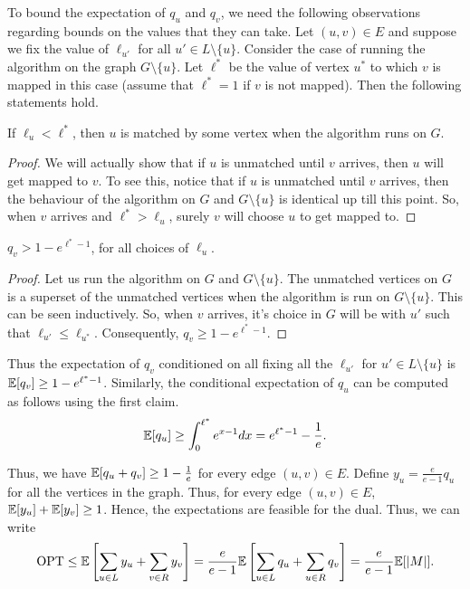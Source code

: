 To bound the expectation of $q_u$ and $q_v$, we need the following observations
regarding bounds on the values that they can take. Let $(u,v)\in E$ and suppose
we fix the value of $\ell_{u'}$ for all $u'\in L \setminus \{u\}$. Consider the
case of running the algorithm on the graph $G \setminus \{u\}$. Let $\ell^*$ be the
value of vertex $u^*$ to which $v$ is mapped in this case (assume that
$\ell^* = 1$ if $v$ is not mapped). Then the following statements hold.

\begin{claim}
  If $\ell_u < \ell^*$, then $u$ is matched by some vertex when the
  algorithm runs on $G$.
\end{claim}
\begin{proof}
  We will actually show that if $u$ is unmatched until $v$ arrives, then $u$
  will get mapped to $v$. To see this, notice that if $u$ is unmatched until $v$
  arrives, then the behaviour of the algorithm on $G$ and $G\setminus \{u\}$ is
  identical up till this point. So, when $v$ arrives and $\ell^* > \ell_u$,
  surely $v$ will choose $u$ to get mapped to.
\end{proof}

\begin{claim}
  $q_v > 1 - e^{\ell^* - 1}$, for all choices of $\ell_u$.
\end{claim}
\begin{proof}
  Let us run the algorithm on $G$ and $G\setminus \{u\}$. The unmatched vertices
  on $G$ is a superset of the unmatched vertices when the algorithm is run on
  $G\setminus \{u\}$. This can be seen inductively. So, when $v$ arrives, it's
  choice in $G$ will be with $u'$ such that $\ell_{u'} \leq
  \ell_{u^*}$. Consequently, $q_v \geq 1 - e^{\ell^* - 1}$.
\end{proof}

Thus the expectation of $q_v$ conditioned on all fixing all the $\ell_{u'}$ for
$u' \in L \setminus \{u\}$ is $\mathbb{E}[q_v] \geq 1 - e^{\ell^* - 1}$. Similarly, the
conditional expectation of $q_u$ can be computed as follows using the first claim.
\begin{align*}
  \mathbb{E}[q_u] \geq \int_{0}^{\ell^*} e^{x-1} dx = e^{\ell^*-1} - \frac{1}{e}.
\end{align*}

Thus, we have $\mathbb{E}[q_u + q_v] \geq 1 - \tfrac{1}{e}$ for every edge $(u,v)\in
E$. Define $y_u = \tfrac{e}{e-1} q_u$ for all the vertices in the graph. Thus,
for every edge $(u,v)\in E$, $\mathbb{E}[y_u] + \mathbb{E}[y_v] \geq 1$. Hence, the expectations
are feasible for the dual. Thus, we can write
\begin{align*}
  \operatorname{OPT} \leq \mathbb{E}\left[\sum_{u\in L} y_u + \sum_{v\in R} y_v \right] = \frac{e}{e-1} \mathbb{E}\left[\sum_{u\in L} q_u + \sum_{u\in R} q_v \right] = \frac{e}{e-1}\mathbb{E}[|M|].
\end{align*}


